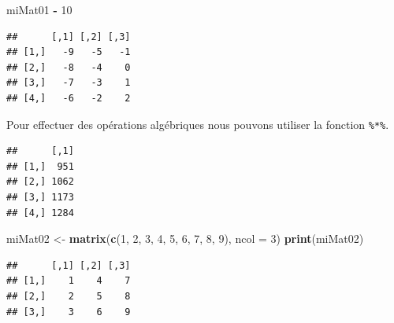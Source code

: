 \documentclass[]{book}
\newenvironment{Shaded}{\begin{snugshade}}{\end{snugshade}}
\newcommand{\CommentTok}[1]{\textcolor[rgb]{0.56,0.35,0.01}{\textit{#1}}}
\newcommand{\DataTypeTok}[1]{\textcolor[rgb]{0.13,0.29,0.53}{#1}}
\newcommand{\DecValTok}[1]{\textcolor[rgb]{0.00,0.00,0.81}{#1}}
\newcommand{\KeywordTok}[1]{\textcolor[rgb]{0.13,0.29,0.53}{\textbf{#1}}}
\newcommand{\NormalTok}[1]{#1}
\newcommand{\OperatorTok}[1]{\textcolor[rgb]{0.81,0.36,0.00}{\textbf{#1}}}
\newcommand{\StringTok}[1]{\textcolor[rgb]{0.31,0.60,0.02}{#1}}
\begin{document}
\begin{Shaded}
\begin{Highlighting}[]
\NormalTok{miMat01 }\OperatorTok{-}\StringTok{ }\DecValTok{10}
\end{Highlighting}
\end{Shaded}

\begin{verbatim}
##      [,1] [,2] [,3]
## [1,]   -9   -5   -1
## [2,]   -8   -4    0
## [3,]   -7   -3    1
## [4,]   -6   -2    2
\end{verbatim}

Pour effectuer des opérations algébriques nous pouvons utiliser la fonction \texttt{\%*\%}.

\begin{Shaded}
\end{Shaded}

\begin{verbatim}
##      [,1]
## [1,]  951
## [2,] 1062
## [3,] 1173
## [4,] 1284
\end{verbatim}

\begin{Shaded}
\begin{Highlighting}[]
\NormalTok{miMat02 <-}\StringTok{ }\KeywordTok{matrix}\NormalTok{(}\KeywordTok{c}\NormalTok{(}\DecValTok{1}\NormalTok{, }\DecValTok{2}\NormalTok{, }\DecValTok{3}\NormalTok{, }\DecValTok{4}\NormalTok{, }\DecValTok{5}\NormalTok{, }\DecValTok{6}\NormalTok{, }\DecValTok{7}\NormalTok{, }\DecValTok{8}\NormalTok{, }\DecValTok{9}\NormalTok{), }\DataTypeTok{ncol =} \DecValTok{3}\NormalTok{)}
\KeywordTok{print}\NormalTok{(miMat02)}
\end{Highlighting}
\end{Shaded}

\begin{verbatim}
##      [,1] [,2] [,3]
## [1,]    1    4    7
## [2,]    2    5    8
## [3,]    3    6    9
\end{verbatim}

\begin{Shaded}
\end{Shaded}
\end{document}
